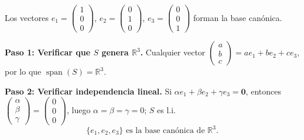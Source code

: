 \begin{example}
Los vectores $e_1 = \begin{pmatrix} 1\\0\\0 \end{pmatrix}$, $e_2 = \begin{pmatrix} 0\\1\\0 \end{pmatrix}$, $e_3 = \begin{pmatrix} 0\\0\\1 \end{pmatrix}$ forman la base canónica.
\begin{myproof}
\textbf{Paso 1: Verificar que $S$ genera $\mathbb{R}^3$.} Cualquier vector $\begin{pmatrix} a\\b\\c \end{pmatrix} = ae_1 + be_2 + ce_3$, por lo que $\operatorname{span}(S)=\mathbb{R}^3$.

\textbf{Paso 2: Verificar independencia lineal.} Si $\alpha e_1 + \beta e_2 + \gamma e_3 = \mathbf{0}$, entonces $\begin{pmatrix} \alpha\\\beta\\\gamma \end{pmatrix} = \begin{pmatrix} 0\\0\\0 \end{pmatrix}$, luego $\alpha = \beta = \gamma = 0$; $S$ es l.i.
$$\boxed{\{e_1,e_2,e_3\} \text{ es la base canónica de } \mathbb{R}^3.}$$
\end{myproof}
\end{example}

